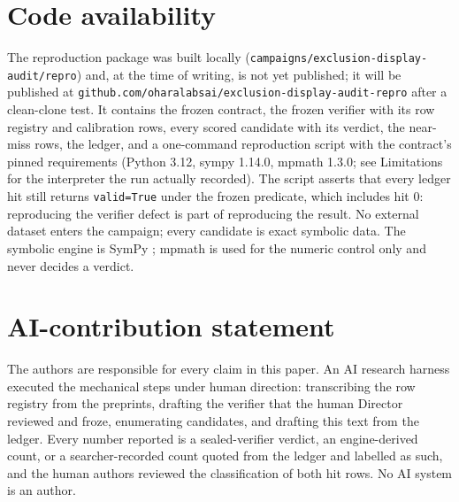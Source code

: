 \documentclass[11pt]{article}
\begin{document}
\section{Code availability}

The reproduction package was built locally (\texttt{campaigns/exclusion-display-audit/repro}) and, at the time of writing, is not yet published; it will be published at \texttt{github.com/oharalabsai/exclusion-display-audit-repro} after a clean-clone test. It contains the frozen contract, the frozen verifier with its row registry and calibration rows, every scored candidate with its verdict, the near-miss rows, the ledger, and a one-command reproduction script with the contract's pinned requirements (Python 3.12, sympy 1.14.0, mpmath 1.3.0; see Limitations for the interpreter the run actually recorded). The script asserts that every ledger hit still returns \texttt{valid=True} under the frozen predicate, which includes hit 0: reproducing the verifier defect is part of reproducing the result. No external dataset enters the campaign; every candidate is exact symbolic data. The symbolic engine is SymPy \cite{sympy2017}; mpmath is used for the numeric control only and never decides a verdict.

\section{AI-contribution statement}

The authors are responsible for every claim in this paper. An AI research harness executed the mechanical steps under human direction: transcribing the row registry from the preprints, drafting the verifier that the human Director reviewed and froze, enumerating candidates, and drafting this text from the ledger. Every number reported is a sealed-verifier verdict, an engine-derived count, or a searcher-recorded count quoted from the ledger and labelled as such, and the human authors reviewed the classification of both hit rows. No AI system is an author.



\end{document}
